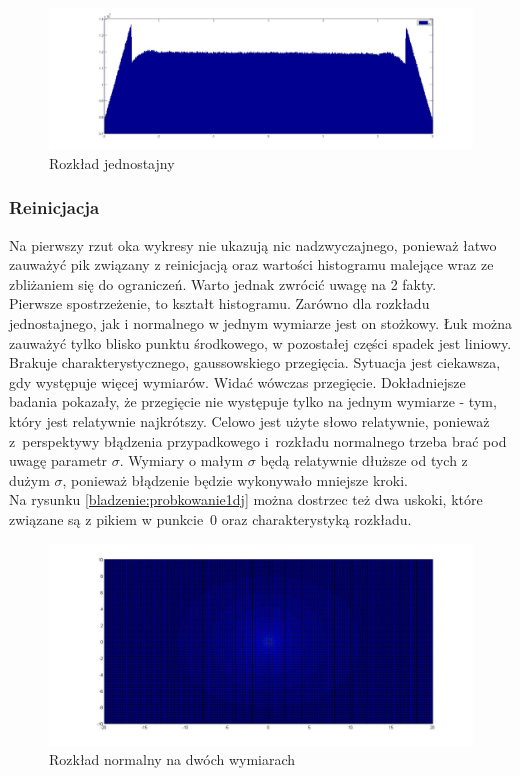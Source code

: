 \documentclass{mini}
\begin{document}
\begin{figure}[H]
\centering
\includegraphics[width=\textwidth]{p_j_100M_1__3_3}
\caption{Rozkład jednostajny}
\label{bladzenie:rzutowanie1dj}
\end{figure}

\subsubsection*{Reinicjacja}
Na pierwszy rzut oka wykresy nie ukazują nic nadzwyczajnego, ponieważ łatwo zauważyć pik związany z reinicjacją oraz wartości histogramu malejące wraz ze zbliżaniem się do ograniczeń. Warto jednak zwrócić uwagę na 2 fakty.\\
Pierwsze spostrzeżenie, to kształt histogramu. Zarówno dla rozkładu jednostajnego, jak i normalnego w jednym wymiarze jest on stożkowy. Łuk można zauważyć tylko blisko punktu środkowego, w pozostałej części spadek jest liniowy. Brakuje charakterystycznego, gaussowskiego przegięcia. Sytuacja jest ciekawsza, gdy występuje więcej wymiarów. Widać wówczas przegięcie. Dokładniejsze badania pokazały, że przegięcie nie występuje tylko na jednym wymiarze - tym, który jest relatywnie najkrótszy. Celowo jest użyte słowo relatywnie, ponieważ z~perspektywy błądzenia przypadkowego i~rozkładu normalnego trzeba brać pod uwagę parametr $\sigma$. Wymiary o małym $\sigma$ będą relatywnie dłuższe od tych z dużym $\sigma$, ponieważ błądzenie będzie wykonywało mniejsze kroki.\\
Na rysunku \ref{bladzenie:probkowanie1dj} można dostrzec też dwa uskoki, które związane są z pikiem w punkcie~$0$ oraz charakterystyką rozkładu.

\begin{figure}[H]
\centering
\includegraphics[width=\textwidth]{ri_n_10M_2__20_20__10_10_4}
\caption{Rozkład normalny na dwóch wymiarach}
\end{figure}
\end{document}
